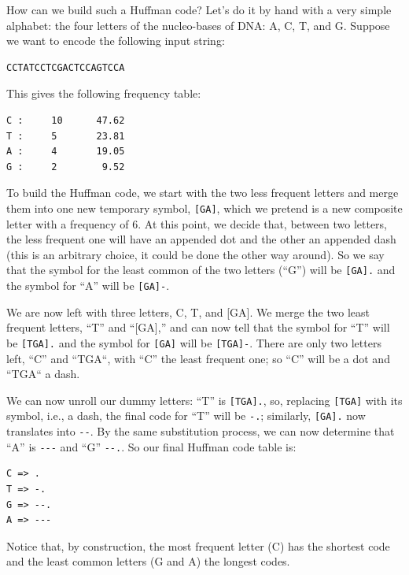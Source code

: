How can we build such a Huffman code? Let's do it by hand with a 
very simple alphabet: the four letters of the nucleo-bases of DNA: A, 
C, T, and G. Suppose we want to encode the following input string:

\begin{verbatim}
CCTATCCTCGACTCCAGTCCA
\end{verbatim}

This gives the following frequency table:

\begin{verbatim}
C :     10      47.62
T :     5       23.81
A :     4       19.05
G :     2        9.52
\end{verbatim}

To build the Huffman code, we start with the two less frequent 
letters and merge them into one new temporary symbol, \verb"[GA]", 
which we pretend is a new composite letter with a 
frequency of 6. At this point, we decide that, between two letters, 
the less frequent one will have an appended dot and the other 
an appended dash (this is an arbitrary choice, it could be done 
the other way around). So we say that the symbol for the least 
common of the two letters (``G'') will be \verb'[GA].' and the 
symbol for ``A'' will be \verb'[GA]-'. 

We are now left with three letters, C, T, and [GA]. We merge the 
two least frequent letters, ``T'' and ``[GA],'' and can now tell 
that the symbol for ``T'' will be \verb'[TGA].' and the symbol for 
\verb'[GA]' will be \verb'[TGA]-'. There are only two letters left, 
``C'' and ``TGA``, with ``C'' the least frequent one; so ``C'' will 
be a dot and ``TGA`` a dash. 

We can now unroll our dummy letters: ``T'' is \verb'[TGA].', so, 
replacing \verb'[TGA]' with its symbol, i.e., a dash, the 
final code for ``T'' will be \verb'-.'; similarly, \verb'[GA].' 
now translates into \verb'--'. By the same substitution process, 
we can now determine that ``A'' is \verb'---' and ``G'' 
\verb'--.'. So our final Huffman code table is:

\begin{verbatim}
C => .
T => -.
G => --.
A => ---
\end{verbatim}

Notice that, by construction, the most frequent letter (C) 
has the shortest code and the least common letters (G and A) 
the longest codes.

